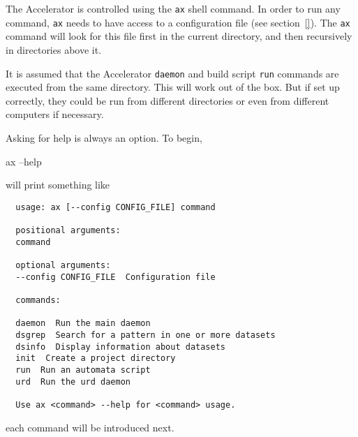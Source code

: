 
\newcommand{\cmd}{\texttt{ax}\xspace}





The Accelerator is controlled using the \cmd shell command.  In order
to run any command, \cmd needs to have access to a configuration file
(see section~\ref{}).  The \cmd command will look for this file first
in the current directory, and then recursively in directories above
it.

It is assumed that the Accelerator \texttt{daemon} and build script
\texttt{run} commands are executed from the same directory.  This will
work out of the box.  But if set up correctly, they could be run from
different directories or even from different computers if necessary.

Asking for help is always an option.  To begin,
\begin{shell}
  ax --help
\end{shell}
will print something like
\begin{snugshade}
\begin{verbatim}
  usage: ax [--config CONFIG_FILE] command

  positional arguments:
  command

  optional arguments:
  --config CONFIG_FILE  Configuration file

  commands:

  daemon  Run the main daemon
  dsgrep  Search for a pattern in one or more datasets
  dsinfo  Display information about datasets
  init  Create a project directory
  run  Run an automata script
  urd  Run the urd daemon

  Use ax <command> --help for <command> usage.
\end{verbatim}
\end{snugshade}
each command will be introduced next.





